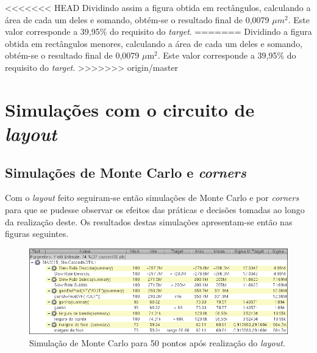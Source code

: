 \documentclass[11pt]{article}
\numberwithin{equation}{section}
\begin{document}
<<<<<<< HEAD
Dividindo assim a figura obtida em rectângulos, calculando a área de cada um deles e somando, obtém-se o resultado final de 0,0079 $\mu m^2$. Este valor corresponde a 39,95\% do requisito do \textit{target}.
=======
Dividindo  a figura obtida em rectângulos menores, calculando a área de cada um deles e somando, obtém-se o resultado final de 0,0079 $\mu\text{m}^2$. Este valor corresponde a 39,95\% do requisito do \textit{target}.
>>>>>>> origin/master

\section{Simulações com o circuito de \textit{layout}}

\subsection{Simulações de Monte Carlo e \textit{corners}}

Com o \textit{layout} feito seguiram-se então simulações de Monte Carlo e por \textit{corners} para que se pudesse observar os efeitos das práticas e decisões tomadas ao longo da realização deste. Os resultados destas simulações apresentam-se então nas figuras seguintes.

\begin{figure}[H]
	\centering
	\includegraphics[keepaspectratio=true, scale=0.50]{exps/MonteCarlo_50pt_Novo_MultiTransistor_Layout}
	\vspace{-0.5em}
	\caption{Simulação de Monte Carlo para 50 pontos após realização do \textit{layout}.}
	\vspace{-0.8em} 
\end{figure}
\end{document}
